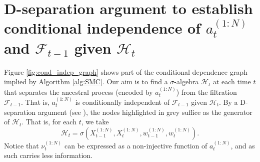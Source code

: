 \documentclass{article} %
\theoremstyle{definition}
\newcommand{\1}[1]{\mathbbm{1}_{\{#1\}}}
\begin{document}
\section{D-separation argument to establish conditional independence of $a_t^{(1:N)}$ and $\mathcal{F}_{t-1}$ given $\mathcal{H}_t$}\label{app:dseparation}
Figure \ref{fig:cond_indep_graph} shows part of the conditional dependence graph implied by Algorithm \ref{alg:SMC}. Our aim is to find a $\sigma$-algebra $\mathcal{H}_t$ at each time $t$ that separates the ancestral process (encoded by $a_t^{(1:N)}$) from the filtration $\mathcal{F}_{t-1}$. That is, $a_t^{(1:N)}$ is conditionally independent of $\mathcal{F}_{t-1}$ given $\mathcal{H}_t$.
By a D-separation argument (see \cite{Verma1988}), the nodes highlighted in grey suffice as the generator of $\mathcal{H}_t$. That is, for each $t$, we take
\begin{equation*}
\mathcal{H}_t = \sigma(X_{t-1}^{(1:N)}, X_t^{(1:N)}, w_{t-1}^{(1:N)}, w_t^{(1:N)} ).
\end{equation*}
Notice that $\nu_t^{(1:N)}$ can be expressed as a non-injective function of $a_t^{(1:N)}$, and as such carries less information.
\end{document}
